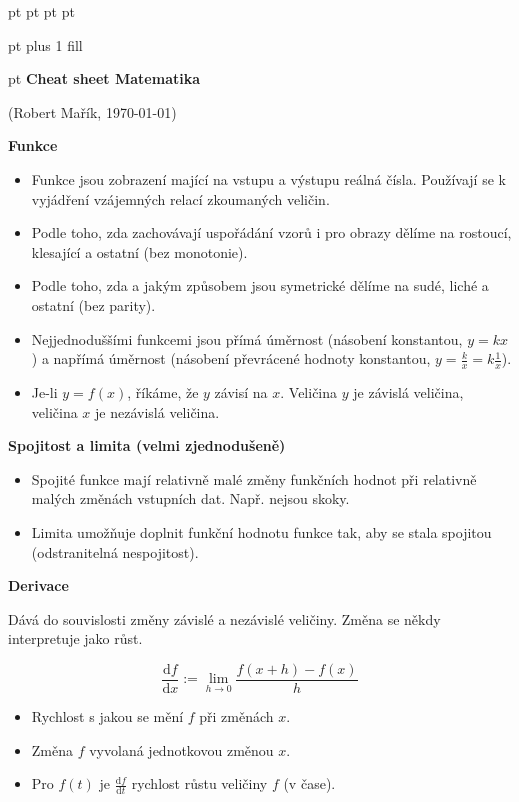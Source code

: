 \documentclass{article}
\begin{document}
 pt
 pt
\let\phi\varphi
\footnotesize
{} pt
 pt
\begin{multicols}{3}
 pt plus 1 fill

{\centering {} pt
\textbf{Cheat sheet Matematika}

(Robert Mařík, \today)

}

\textbf{Funkce}

\begin{itemize}
\item Funkce jsou zobrazení mající na vstupu a výstupu reálná čísla. Používají se k vyjádření vzájemných relací zkoumaných veličin.
\item Podle  toho, zda zachovávají uspořádání vzorů i pro obrazy dělíme na rostoucí, klesající a ostatní (bez monotonie).
\item Podle toho, zda a jakým způsobem jsou symetrické dělíme na sudé, liché a ostatní (bez parity).
\item Nejjednoduššími funkcemi jsou přímá úměrnost (násobení konstantou, $y=kx$) a napřímá úměrnost (násobení převrácené hodnoty konstantou, $y=\frac kx=k\frac 1x$).
\item Je-li $y=f(x)$, říkáme, že $y$ závisí na $x$. Veličina $y$ je závislá veličina, veličina $x$ je nezávislá veličina.
\end{itemize}

\textbf{Spojitost a limita (velmi zjednodušeně)}

\begin{itemize}
\item Spojité funkce mají relativně malé změny funkčních hodnot při relativně malých změnách vstupních dat. Např. nejsou skoky.
\item Limita umožňuje doplnit funkční hodnotu funkce tak, aby se stala spojitou (odstranitelná nespojitost).
\end{itemize}

\textbf{Derivace}

Dává do souvislosti změny závislé a nezávislé veličiny. Změna se někdy interpretuje jako růst.

$$\frac{\mathrm df}{\mathrm dx}:=\lim_{h\to 0}\frac{f(x+h)-f(x)}{h}$$

\begin{itemize}
\item Rychlost s jakou se mění $f$ při změnách $x$.
\item Změna $f$ vyvolaná jednotkovou změnou $x$.
\item Pro $f(t)$ je $\frac{\mathrm df}{\mathrm dt}$ rychlost růstu veličiny $f$ (v čase).
\end{itemize}


\end{multicols}
\end{document}
